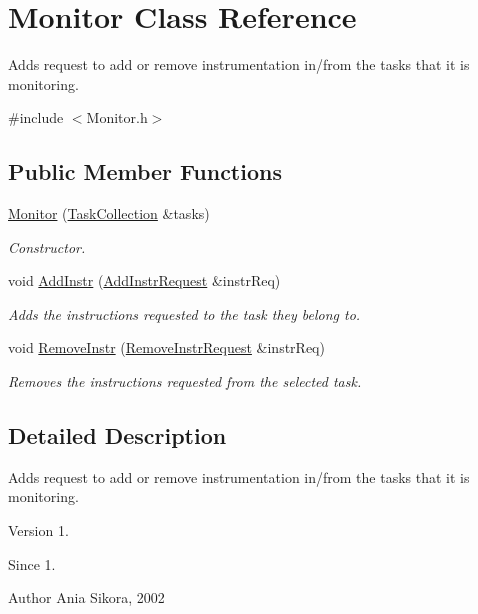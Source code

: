 \hypertarget{class_monitor}{\section{Monitor Class Reference}
\label{class_monitor}
}


Adds request to add or remove instrumentation in/from the tasks that it is monitoring.  




{\ttfamily \#include $<$Monitor.\-h$>$}

\subsection*{Public Member Functions}
\begin{DoxyCompactItemize}
\item 
\hyperlink{class_monitor_a40a03e4b9ea61cb3394956cebebfddeb}{Monitor} (\hyperlink{class_task_collection}{Task\-Collection} \&tasks)
\begin{DoxyCompactList}\small\item\em Constructor. \end{DoxyCompactList}\item 
void \hyperlink{class_monitor_a45d639b99e3a7152b90f722fc64ad2f8}{Add\-Instr} (\hyperlink{class_common_1_1_add_instr_request}{Add\-Instr\-Request} \&instr\-Req)
\begin{DoxyCompactList}\small\item\em Adds the instructions requested to the task they belong to. \end{DoxyCompactList}\item 
void \hyperlink{class_monitor_addc6c841719134e41cc6c773f7e3eff9}{Remove\-Instr} (\hyperlink{class_common_1_1_remove_instr_request}{Remove\-Instr\-Request} \&instr\-Req)
\begin{DoxyCompactList}\small\item\em Removes the instructions requested from the selected task. \end{DoxyCompactList}\end{DoxyCompactItemize}


\subsection{Detailed Description}
Adds request to add or remove instrumentation in/from the tasks that it is monitoring. 

\begin{DoxyVersion}{Version}
1. 
\end{DoxyVersion}
\begin{DoxySince}{Since}
1. 
\end{DoxySince}
\begin{DoxyAuthor}{Author}
Ania Sikora, 2002 
\end{DoxyAuthor}


